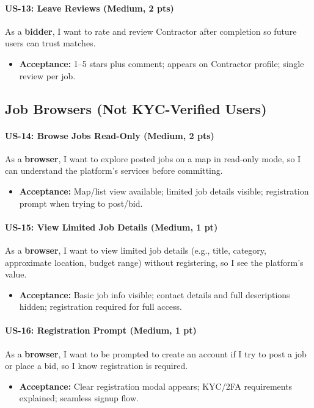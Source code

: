 \documentclass[11pt]{article}
\begin{document}
\paragraph{US-13: Leave Reviews (Medium, 2 pts)}
As a \textbf{bidder}, I want to rate and review Contractor after completion so future users can trust matches.
\begin{itemize}[leftmargin=1.4em]
  \item \textbf{Acceptance:} 1–5 stars plus comment; appears on Contractor profile; single review per job.
\end{itemize}

\subsection*{Job Browsers (Not KYC-Verified Users)}
\paragraph{US-14: Browse Jobs Read-Only (Medium, 2 pts)}
As a \textbf{browser}, I want to explore posted jobs on a map in read-only mode, so I can understand the platform's services before committing.
\begin{itemize}[leftmargin=1.4em]
  \item \textbf{Acceptance:} Map/list view available; limited job details visible; registration prompt when trying to post/bid.
\end{itemize}

\paragraph{US-15: View Limited Job Details (Medium, 1 pt)}
As a \textbf{browser}, I want to view limited job details (e.g., title, category, approximate location, budget range) without registering, so I see the platform's value.
\begin{itemize}[leftmargin=1.4em]
  \item \textbf{Acceptance:} Basic job info visible; contact details and full descriptions hidden; registration required for full access.
\end{itemize}

\paragraph{US-16: Registration Prompt (Medium, 1 pt)}
As a \textbf{browser}, I want to be prompted to create an account if I try to post a job or place a bid, so I know registration is required.
\begin{itemize}[leftmargin=1.4em]
  \item \textbf{Acceptance:} Clear registration modal appears; KYC/2FA requirements explained; seamless signup flow.
\end{itemize}
\end{document}
